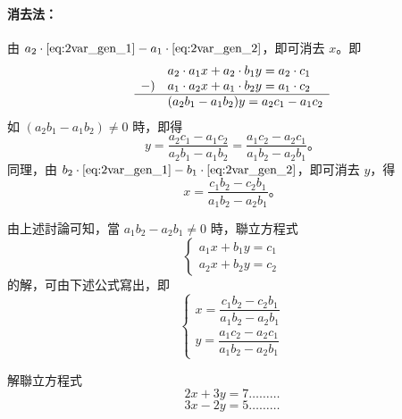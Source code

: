 \paragraph{消去法：}
由 $a_2 \cdot \eqref{eq:2var_gen_1} - a_1 \cdot \eqref{eq:2var_gen_2}$，即可消去 $x$。即
\begin{equation*}
\begin{array}{r@{\quad}l}
  & a_2 \cdot a_1 x + a_2 \cdot b_1 y = a_2 \cdot c_1 \\
  -) & a_1 \cdot a_2 x + a_1 \cdot b_2 y = a_1 \cdot c_2 \\ \hline
  & (a_2 b_1 - a_1 b_2) y = a_2 c_1 - a_1 c_2
\end{array}
\end{equation*}
如 $(a_2 b_1 - a_1 b_2) \neq 0$ 時，即得
\begin{equation*}
  y = \frac{a_2 c_1 - a_1 c_2}{a_2 b_1 - a_1 b_2} = \frac{a_1 c_2 - a_2 c_1}{a_1 b_2 - a_2 b_1} \text{。}
\end{equation*}
同理，由 $b_2 \cdot \eqref{eq:2var_gen_1} - b_1 \cdot \eqref{eq:2var_gen_2}$，即可消去 $y$，得
\begin{equation*}
  x = \frac{c_1 b_2 - c_2 b_1}{a_1 b_2 - a_2 b_1} \text{。}
\end{equation*}

由上述討論可知，當 $a_1 b_2 - a_2 b_1 \neq 0$ 時，聯立方程式
\begin{equation*}
\begin{cases}
  a_1 x + b_1 y = c_1 \\
  a_2 x + b_2 y = c_2
\end{cases}
\end{equation*}
的解，可由下述公式寫出，即
\begin{equation}\label{eq:2var_cramer_formula}
\begin{cases}
  x = \dfrac{c_1 b_2 - c_2 b_1}{a_1 b_2 - a_2 b_1} \\[1.2em]
  y = \dfrac{a_1 c_2 - a_2 c_1}{a_1 b_2 - a_2 b_1}
\end{cases}
\end{equation}

\begin{example}\label{ex:4-3-4}
解聯立方程式
\begin{equation}\label{eq:ex_2var_1}
  2x + 3y = 7 \dots\dots\dots
\end{equation}
\begin{equation}\label{eq:ex_2var_2}
  3x - 2y = 5 \dots\dots\dots
\end{equation}
\end{example}

